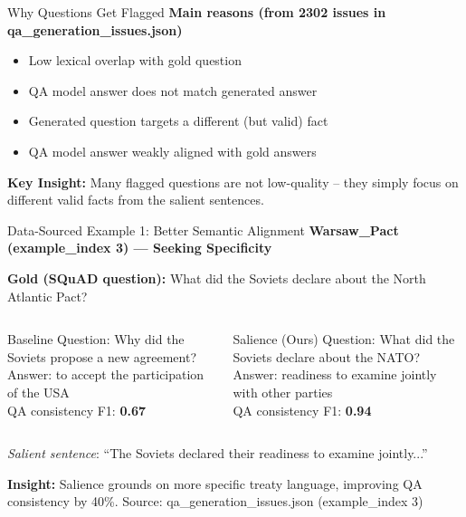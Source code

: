 \documentclass[aspectratio=169]{beamer}
\begin{document}
\begin{frame}{Why Questions Get Flagged}
\small
\textbf{Main reasons (from 2302 issues in qa\_generation\_issues.json)}

\begin{itemize}
  \item Low lexical overlap with gold question
  \item QA model answer does not match generated answer
  \item Generated question targets a different (but valid) fact
  \item QA model answer weakly aligned with gold answers
\end{itemize}

\textbf{Key Insight:} Many flagged questions are not low-quality -- they simply focus on different valid facts from the salient sentences.
\end{frame}

\begin{frame}{Data-Sourced Example 1: Better Semantic Alignment}
\small
\textbf{Warsaw\_Pact (example\_index 3) — Seeking Specificity}

\scriptsize \textbf{Gold (SQuAD question):} What did the Soviets declare about the North Atlantic Pact?

\vspace{0.3em}
\begin{columns}[T,onlytextwidth]
\begin{block}{Baseline}
Question: Why did the Soviets propose a new agreement? \\
Answer: to accept the participation of the USA \\
QA consistency F1: \textbf{0.67}
\end{block}

\begin{alertblock}{Salience (Ours)}
Question: What did the Soviets declare about the NATO? \\
Answer: readiness to examine jointly with other parties \\
QA consistency F1: \textbf{0.94}
\end{alertblock}
\end{columns}

\vspace{0.3em}
\scriptsize \textit{Salient sentence}: ``The Soviets declared their readiness to examine jointly...''

\vspace{0.2em}
\textbf{Insight:} Salience grounds on more specific treaty language, improving QA consistency by 40\%.
\scriptsize Source: qa\_generation\_issues.json (example\_index 3)
\end{frame}
\end{document}
